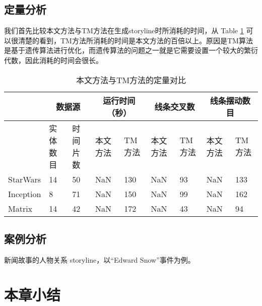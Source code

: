 \subsection{定量分析}
我们首先比较本文方法与TM方法在生成storyline时所消耗的时间，从 Table \ref{table:quantitative-analysis} 可以很清楚的看到，TM方法所消耗的时间是本文方法的百倍以上。原因是TM算法是基于遗传算法进行优化，而遗传算法的问题之一就是它需要设置一个较大的繁衍代数，因此消耗的时间会很长。
\begin{table}[htb]
\caption{本文方法与TM方法的定量对比}
\label{table:quantitative-analysis}
\begin{center}
  \begin{tabular}{|*{9}{l |}}\hline
                    & \multicolumn{2}{c|}{数据源} & \multicolumn{2}{c|}{运行时间（秒）} & \multicolumn{2}{c|}{线条交叉数} & \multicolumn{2}{c|}{线条摆动数目} \\ \hline
                    & 实体数目 &  时间片数 & 本文方法 & TM 方法 & 本文方法 & TM 方法 & 本文方法 & TM 方法 \\ \hline
    StarWars & 14           & 50             & NaN         & 130       &  NaN       &  93        &  NaN       & 133        \\ \hline
    Inception &  8            & 71             & NaN         & 150       &  NaN       &  99        &  NaN       & 162        \\ \hline
    Matrix      & 14           & 42             & NaN         & 172       &  NaN       &  43        &  NaN       & 94          \\ \hline
  \end{tabular}
\end{center}
\end{table}

\subsection{案例分析}
新闻故事的人物关系 storyline，以“Edward Snow”事件为例。

\section{本章小结}







